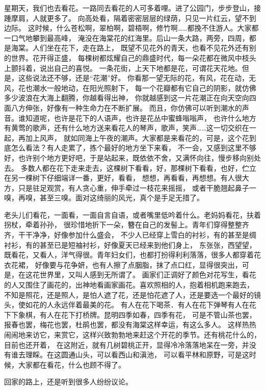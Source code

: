 \documentclass[12pt,UTF8]{ctexbook}
\begin{document}
星期天，我们也去看花。一路同去看花的人可多着哩。进了公园门，步步登山，接踵摩肩，人就更多了。
向高处看，隔着密密层层的绿荫，只见一片红云，望不到边际。
这时候，什么苍松啊，翠柏啊，碧梧啊，修竹啊……都挽不住游人。大家都一口气地攀到最高峰，
淹没在海棠花的红海里。后山一条大路，两旁，四周，都是海棠。人们坐在花下，走在路上，
既望不见花外的青天，也看不见花外还有别的世界。花开得正盛，
每棵树都炫耀自己的鼎盛时代，每一朵花都在微风中枝头上颤抖着，说出自己的喜悦。
一条花街，上天下地都是花，可谓花天花地。但是，这些说法还不够，还是“花潮”好。
你看那一望无际的花，有风，花在动，无风，花也潮水一般地动，在阳光照射下，
每一个花瓣都有它自己的阴影，就仿佛多少波浪在大海上翻腾，你越看得出神，
你就越感到这一片花潮正在向天空向四面八方伸张，好像有一种生命力在不断扩展。
而且，你仿佛可以听到潮水的声音。谁知道呢，也许是花下的人语声，也许是花丛中蜜蜂嗡嗡声，
也许什么地方有黄莺的歌声，还有什么地方送来看花人的琴声，歌声，笑声……这一切交织在一起，再加上风声，
就如同海上午夜的潮声。大家都是来看花的，可是，这个花到底怎么看法？有人走累了，拣个最好的地方坐下来看，
不一会，又感到这里不够好，也许别个地方更好吧，于是站起来，既依依不舍，又满怀向往，慢步移向别处去。
多数人都在花下走来走去，这棵树下看看，好，那棵树下看看，也好，伫立在另一棵树下仔细端详一番，更好，看看，
想想，再看看，再想想。有人很大方，只是驻足观赏，有人贪心重，伸手牵过一枝花来摇摇，
或者干脆翘起鼻子一嗅，再嗅，甚至三嗅。面对这绮丽的风光，真个是手足无措了。

老头儿们看花，一面看，一面自言自语，或者嘴里低吟着什么。老妈妈看花，扶着拐杖，牵着孙孙，
很珍惜地折下一朵，簪在自己的发髻上。青年们穿得整整齐齐，干干净净，好像参加什么盛会，
不少人已经穿上雪白的衬衫，有的甚至是绸衬衫，有的甚至已是短袖衬衫，好像夏天已经来到他们身上，
东张张，西望望，既看花，又看人，洋气得很。青年妇女们，也都打扮得利利落落，很多人都穿着花衣花裙，
好像要与花争妍，也有人擦了点胭脂，抹了点口红，显得很突出，可是，在这花世界里，又叫人感到无所谓了。
画家们正调好了颜色对花写生，看花的人又围住了画花的，出神地看画家画花。喜欢照相的人，抱着相机跑来跑去，
不知是照花，还是照人，是怕人遮了花，还是怕花遮了人，还是要选一个最好的镜头，使如花的人永远伴着最美的花。
有人在花下喝茶．有人在花下弹琴有人在花下下象棋，有人在花下打桥牌。昆明四季如春，四季有花，
可是不管山茶也罢，报春也罢，梅花也罢，杜鹃也罢，都没有海棠这样幸运，有这么多人。
这样热热闹闹地来访它，来赏它，这样兴致勃勃地来赶这个开花的季节。还有桃花什么的，目前也还开着，
在这附近，就有几树碧桃正开，显得冷冷落落地呆在一旁，并没有谁去理睬。在这圆通山头，可以看西山和滇池，
可以看平林和原野，可是这时候，大家都在看花，什么也顾不得了。

回家的路上，还是听到很多人纷纷议论。
\end{document}
